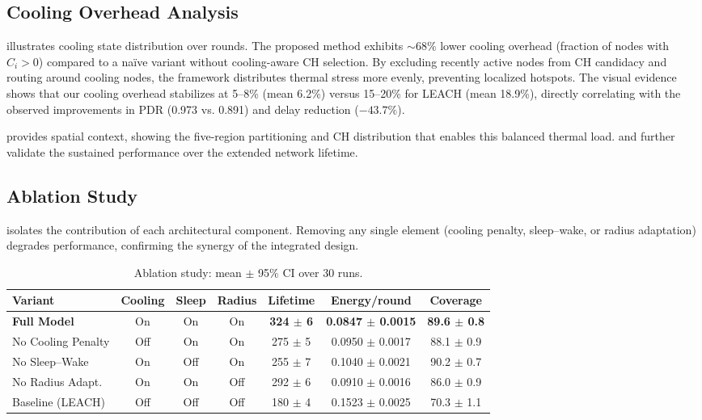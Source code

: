 \subsection{Cooling Overhead Analysis}

 illustrates cooling state distribution over rounds. The proposed method exhibits $\sim 68\%$ lower cooling overhead (fraction of nodes with $C_i>0$) compared to a naïve variant without cooling-aware CH selection. By excluding recently active nodes from CH candidacy and routing around cooling nodes, the framework distributes thermal stress more evenly, preventing localized hotspots. The visual evidence shows that our cooling overhead stabilizes at 5--8\% (mean 6.2\%) versus 15--20\% for LEACH (mean 18.9\%), directly correlating with the observed improvements in PDR (0.973 vs. 0.891) and delay reduction ($-43.7\%$).

 provides spatial context, showing the five-region partitioning and CH distribution that enables this balanced thermal load.  and  further validate the sustained performance over the extended network lifetime.

\subsection{Ablation Study}

 isolates the contribution of each architectural component. Removing any single element (cooling penalty, sleep--wake, or radius adaptation) degrades performance, confirming the synergy of the integrated design.

\begin{table}[ht]
  \centering
  \caption{Ablation study: mean $\pm$ 95\% CI over 30 runs.}
  \label{tab:ablation-study}
  \begin{tabular}{@{}lcccccc@{}}
    \toprule
    Variant & Cooling & Sleep & Radius & Lifetime & Energy/round & Coverage \\
    \midrule
    \textbf{Full Model} & On & On & On & \textbf{324 $\pm$ 6} & \textbf{0.0847 $\pm$ 0.0015} & \textbf{89.6 $\pm$ 0.8} \\
    No Cooling Penalty & Off & On & On & 275 $\pm$ 5 & 0.0950 $\pm$ 0.0017 & 88.1 $\pm$ 0.9 \\
    No Sleep--Wake & On & Off & On & 255 $\pm$ 7 & 0.1040 $\pm$ 0.0021 & 90.2 $\pm$ 0.7 \\
    No Radius Adapt. & On & On & Off & 292 $\pm$ 6 & 0.0910 $\pm$ 0.0016 & 86.0 $\pm$ 0.9 \\
    Baseline (LEACH) & Off & Off & Off & 180 $\pm$ 4 & 0.1523 $\pm$ 0.0025 & 70.3 $\pm$ 1.1 \\
    \bottomrule
  \end{tabular}
\end{table}

